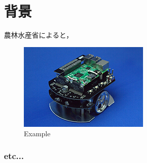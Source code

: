 
\section{背景}

農林水産省によると，
\begin{figure}[hbtp]
  \centering
 \includegraphics[keepaspectratio, scale=0.8]
      {images/RaspberryPiMouse.png}
 \caption{Example}
 \label{Fig:Example}
\end{figure}

\subsubsection{etc...}
\newpage

